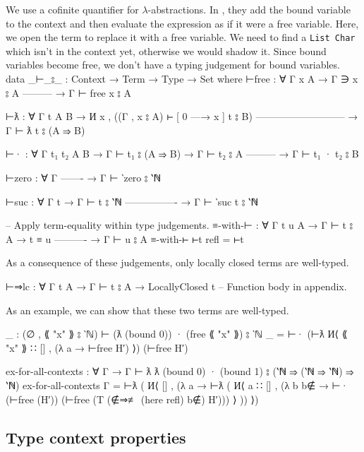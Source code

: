\documentclass[logo,bsc,singlespacing,parskip,online]{infthesis}
\renewenvironment{code}{\mintedcopy[breaklines,breaksymbolleft=\;]{agda}}{\endmintedcopy}
\begin{document}
We use a cofinite quantifier for $\lambda$-abstractions. In \citet{wadler_programming_2022}, they
add the bound variable to the context and then evaluate the expression as if it were a free
variable. Here, we open the term to replace it with a free variable. We need to find a \texttt{List
Char} which isn't in the context yet, otherwise we would shadow it. Since bound variables become
free, we don't have a typing judgement for bound variables.
\begin{code}
data _⊢_⦂_ : Context → Term → Type → Set where
  ⊢free : ∀ {Γ x A}
    → Γ ∋ x ⦂ A
      ---------
    → Γ ⊢ free x ⦂ A

  ⊢ƛ : ∀ {Γ t A B}
    → И x , ((Γ , x ⦂ A) ⊢ [ 0 —→ x ] t ⦂ B)
      ---------------------------
    → Γ ⊢ ƛ t ⦂ (A ⇒ B)

  ⊢· : ∀ {Γ t₁ t₂ A B}
    → Γ ⊢ t₁ ⦂ (A ⇒ B)
    → Γ ⊢ t₂ ⦂ A
      ---------
    → Γ ⊢ t₁ · t₂ ⦂ B

  ⊢zero : ∀ {Γ}
      -------
    → Γ ⊢ ‵zero ⦂ ‵ℕ

  ⊢suc : ∀ {Γ t}
    → Γ ⊢ t ⦂ ‵ℕ
      ----------------
    → Γ ⊢ ‵suc t ⦂ ‵ℕ

-- Apply term-equality within type judgements.
≡-with-⊢ : ∀ {Γ t u A}
  → Γ ⊢ t ⦂ A
  → t ≡ u
    ----------
  → Γ ⊢ u ⦂ A
≡-with-⊢ ⊢t refl = ⊢t
\end{code}

As a consequence of these judgements, only locally closed terms are well-typed.

\begin{code}
⊢⇒lc : ∀ {Γ t A} → Γ ⊢ t ⦂ A → LocallyClosed t
-- Function body in appendix.
\end{code}

As an example, we can show that these two terms are well-typed.

\begin{code}
_ : (∅ , ⟪ "x" ⟫ ⦂ ‵ℕ) ⊢ (ƛ (bound 0)) · (free ⟪ "x" ⟫) ⦂ ‵ℕ
_ = ⊢· (⊢ƛ И⟨ ⟪ "x" ⟫ ∷ [] , (λ a → ⊢free H′) ⟩) (⊢free H′)

ex-for-all-contexts : ∀ {Γ} → Γ ⊢ ƛ ƛ (bound 0) · (bound 1) ⦂ (‵ℕ ⇒ (‵ℕ ⇒ ‵ℕ) ⇒ ‵ℕ)
ex-for-all-contexts {Γ} = ⊢ƛ (
  И⟨ [] , (λ a → ⊢ƛ (
    И⟨ a ∷ []
    , (λ b {b∉} → ⊢· (⊢free (H′)) (⊢free (T (∉⇒≢ (here refl) b∉) H′))) ⟩ )) ⟩)
\end{code}

\subsection{Type context properties}
\end{document}
